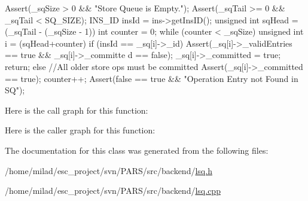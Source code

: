 \begin{DoxyCode}
                                            {
        Assert(_sqSize > 0 && "Store Queue is Empty.");
        Assert(_sqTail >= 0 && _sqTail < SQ_SIZE);
        INS_ID insId = ins->getInsID();
        unsigned int sqHead = (_sqTail - (_sqSize - 1)) %
        int counter = 0;
        while (counter < _sqSize) {
                unsigned int i = (sqHead+counter)%
                if (insId == _sq[i]->_id) {
                        Assert(_sq[i]->_validEntries == true && _sq[i]->_committe
      d == false);
                        _sq[i]->_committed = true;
                        return;
                } else {
                        //All older store ops must be committed
                        Assert(_sq[i]->_committed == true);
                }
                counter++;
        }
        Assert(false == true && "Operation Entry not Found in SQ");
}
\end{DoxyCode}


Here is the call graph for this function:




Here is the caller graph for this function:




The documentation for this class was generated from the following files:\begin{DoxyCompactItemize}
\item 
/home/milad/esc\_\-project/svn/PARS/src/backend/\hyperlink{lsq_8h}{lsq.h}\item 
/home/milad/esc\_\-project/svn/PARS/src/backend/\hyperlink{lsq_8cpp}{lsq.cpp}\end{DoxyCompactItemize}
